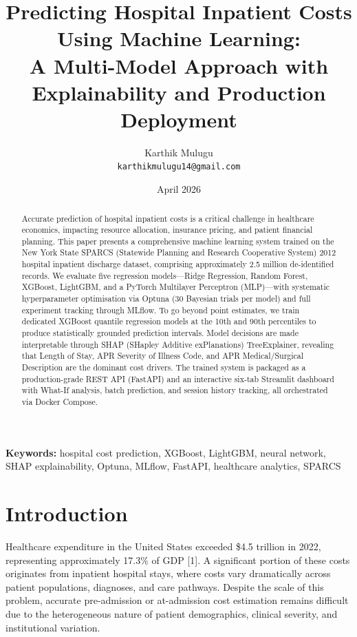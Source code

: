 \documentclass[11pt,a4paper]{article}
\title{Predicting Hospital Inpatient Costs Using Machine Learning:\\A Multi-Model Approach with Explainability and Production Deployment}
\author{Karthik Mulugu\\\texttt{karthikmulugu14@gmail.com}}
\date{April 2026}
\begin{document}
\maketitle

\begin{abstract}
Accurate prediction of hospital inpatient costs is a critical challenge in healthcare economics, impacting resource allocation, insurance pricing, and patient financial planning. This paper presents a comprehensive machine learning system trained on the New York State SPARCS (Statewide Planning and Research Cooperative System) 2012 hospital inpatient discharge dataset, comprising approximately 2.5 million de-identified records. We evaluate five regression models---Ridge Regression, Random Forest, XGBoost, LightGBM, and a PyTorch Multilayer Perceptron (MLP)---with systematic hyperparameter optimisation via Optuna (30 Bayesian trials per model) and full experiment tracking through MLflow. To go beyond point estimates, we train dedicated XGBoost quantile regression models at the 10th and 90th percentiles to produce statistically grounded prediction intervals. Model decisions are made interpretable through SHAP (SHapley Additive exPlanations) TreeExplainer, revealing that Length of Stay, APR Severity of Illness Code, and APR Medical/Surgical Description are the dominant cost drivers. The trained system is packaged as a production-grade REST API (FastAPI) and an interactive six-tab Streamlit dashboard with What-If analysis, batch prediction, and session history tracking, all orchestrated via Docker Compose.
\end{abstract}

\noindent\textbf{Keywords:} hospital cost prediction, XGBoost, LightGBM, neural network, SHAP explainability, Optuna, MLflow, FastAPI, healthcare analytics, SPARCS

\section{Introduction}
Healthcare expenditure in the United States exceeded \$4.5 trillion in 2022, representing approximately 17.3\% of GDP [1]. A significant portion of these costs originates from inpatient hospital stays, where costs vary dramatically across patient populations, diagnoses, and care pathways. Despite the scale of this problem, accurate pre-admission or at-admission cost estimation remains difficult due to the heterogeneous nature of patient demographics, clinical severity, and institutional variation.
\end{document}

